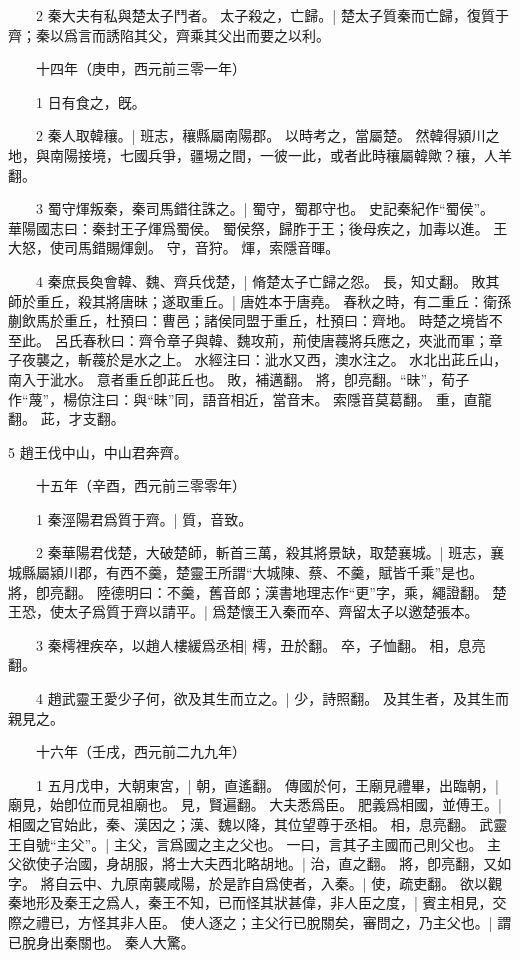 　　2 秦大夫有私與楚太子鬥者。
	太子殺之，亡歸。|{
	楚太子質秦而亡歸，復質于齊；秦以爲言而誘陷其父，齊乘其父出而要之以利。
}

　　十四年（庚申，西元前三零一年）

　　1 日有食之，旣。


　　2 秦人取韓穰。|{
	班志，穰縣屬南陽郡。
	以時考之，當屬楚。
	然韓得潁川之地，與南陽接境，七國兵爭，疆埸之間，一彼一此，或者此時穰屬韓歟？穰，人羊翻。
}

　　3 蜀守煇叛秦，秦司馬錯往誅之。|{
	蜀守，蜀郡守也。
	史記秦紀作“蜀侯”。
	華陽國志曰：秦封王子煇爲蜀侯。
	蜀侯祭，歸胙于王；後母疾之，加毒以進。
	王大怒，使司馬錯賜煇劍。
	守，音狩。
	煇，索隱音暉。
}

　　4 秦庶長奐會韓、魏、齊兵伐楚，|{
	脩楚太子亡歸之怨。
	長，知丈翻。
}
敗其師於重丘，殺其將唐昧；遂取重丘。|{
	唐姓本于唐堯。
	春秋之時，有二重丘：衛孫蒯飲馬於重丘，杜預曰：曹邑；諸侯同盟于重丘，杜預曰：齊地。
	時楚之境皆不至此。
	呂氏春秋曰：齊令章子與韓、魏攻荊，荊使唐薎將兵應之，夾泚而軍；章子夜襲之，斬薎於是水之上。
	水經注曰：泚水又西，澳水注之。
	水北出茈丘山，南入于泚水。
	意者重丘卽茈丘也。
	敗，補邁翻。
	將，卽亮翻。“昧”，荀子作“蔑”，楊倞注曰：與“昧”同，語音相近，當音末。
	索隱音莫葛翻。
	重，直龍翻。
	茈，才支翻。
}

5 趙王伐中山，中山君奔齊。


　　十五年（辛酉，西元前三零零年）

　　1 秦涇陽君爲質于齊。|{
	質，音致。
}

　　2 秦華陽君伐楚，大破楚師，斬首三萬，殺其將景缺，取楚襄城。|{
	班志，襄城縣屬潁川郡，有西不羹，楚靈王所謂“大城陳、蔡、不羹，賦皆千乘”是也。
	將，卽亮翻。
	陸德明曰：不羹，舊音郎；漢書地理志作“更”字，乘，繩證翻。
}
楚王恐，使太子爲質于齊以請平。|{
	爲楚懷王入秦而卒、齊留太子以邀楚張本。
}

　　3 秦樗裡疾卒，以趙人樓緩爲丞相|{
	樗，丑於翻。
	卒，子恤翻。
	相，息亮翻。
}

　　4 趙武靈王愛少子何，欲及其生而立之。|{
	少，詩照翻。
	及其生者，及其生而親見之。
}

　　十六年（壬戌，西元前二九九年）

　　1 五月戊申，大朝東宮，|{
	朝，直遙翻。
}
傳國於何，王廟見禮畢，出臨朝，|{
	廟見，始卽位而見祖廟也。
	見，賢遍翻。
}
大夫悉爲臣。
	肥義爲相國，並傅王。|{
	相國之官始此，秦、漢因之；漢、魏以降，其位望尊于丞相。
	相，息亮翻。
}
武靈王自號“主父”。|{
	主父，言爲國之主之父也。
	一曰，言其子主國而己則父也。
}
主父欲使子治國，身胡服，將士大夫西北略胡地。|{
	治，直之翻。
	將，卽亮翻，又如字。
}
將自云中、九原南襲咸陽，於是詐自爲使者，入秦。|{
	使，疏吏翻。
}
欲以觀秦地形及秦王之爲人，秦王不知，已而怪其狀甚偉，非人臣之度，|{
	賓主相見，交際之禮已，方怪其非人臣。
}
使人逐之；主父行已脫關矣，審問之，乃主父也。|{
	謂已脫身出秦關也。
}
秦人大驚。


